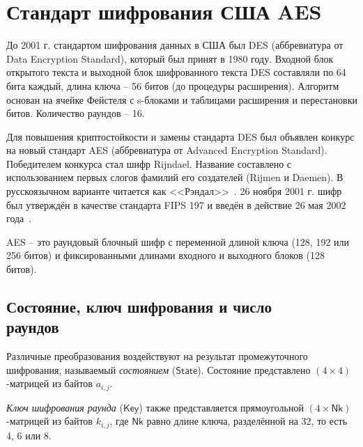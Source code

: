 \section{Стандарт шифрования США AES}

До 2001 г. стандартом шифрования данных в США был DES (аббревиатура от Data Encryption Standard), который был принят в 1980 году. Входной блок открытого текста и выходной блок шифрованного текста DES составляли по 64 бита каждый, длина ключа -- 56 битов (до процедуры расширения). Алгоритм основан на ячейке Фейстеля с s-блоками и таблицами расширения и перестановки битов. Количество раундов -- 16.

Для повышения криптостойкости и замены стандарта DES был объявлен конкурс на новый стандарт AES (аббревиатура от Advanced Encryption Standard). Победителем конкурса стал шифр Rijndael. Название составлено с использованием первых слогов фамилий его создателей (Rijmen и Daemen). В русскоязычном варианте читается как <<Рэндал>>~\cite{Kiwi:1999}. 26 ноября 2001 г. шифр был утверждён в качестве стандарта FIPS 197 и введён в действие 26 мая 2002 года~\cite{FIPS-PUB-197}.

AES -- это раундовый блочный шифр с переменной длиной ключа (128, 192 или 256 битов) и фиксированными длинами входного и выходного блоков (128 битов).

\subsection[Состояние, ключ шифрования и число раундов]{Состояние, ключ шифрования и число \protect\\ раундов}

Различные преобразования воздействуют на результат промежуточного шифрования, называемый \emph{состоянием} ($\mathsf{State}$). Состояние представлено $(4 \times 4)$-матрицей из байтов $a_{i,j}$.

\emph{Ключ шифрования раунда} ($\mathsf{Key}$) также представляется прямоугольной $(4 \times \mathsf{Nk})$-матрицей из байтов $k_{i,j}$, где $\mathsf{Nk}$ равно длине ключа, разделённой на 32, то есть 4, 6 или 8.

